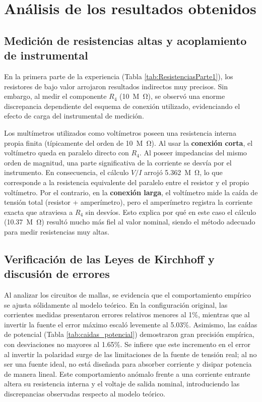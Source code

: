 \documentclass[11pt]{article}
\begin{document}
\section{Análisis de los resultados obtenidos}

\subsection{Medición de resistencias altas y acoplamiento de instrumental}
En la primera parte de la experiencia (Tabla \ref{tab:ResistenciasParte1}), los resistores de bajo valor arrojaron resultados indirectos muy precisos. Sin embargo, al medir el componente $R_4$ (\SI{10}{M\ohm}), se observó una enorme discrepancia dependiente del esquema de conexión utilizado, evidenciando el efecto de carga del instrumental de medición. 

Los multímetros utilizados como voltímetros poseen una resistencia interna propia finita (típicamente del orden de \SI{10}{M\ohm}). Al usar la \textbf{conexión corta}, el voltímetro queda en paralelo directo con $R_4$. Al poseer impedancias del mismo orden de magnitud, una parte significativa de la corriente se desvía por el instrumento. En consecuencia, el cálculo $V/I$ arrojó \SI{5.362}{M\ohm}, lo que corresponde a la resistencia equivalente del paralelo entre el resistor y el propio voltímetro. Por el contrario, en la \textbf{conexión larga}, el voltímetro mide la caída de tensión total (resistor + amperímetro), pero el amperímetro registra la corriente exacta que atraviesa a $R_4$ sin desvíos. Esto explica por qué en este caso el cálculo (\SI{10.37}{M\ohm}) resultó mucho más fiel al valor nominal, siendo el método adecuado para medir resistencias muy altas.

\subsection{Verificación de las Leyes de Kirchhoff y discusión de errores}
Al analizar los circuitos de mallas, se evidencia que el comportamiento empírico se ajusta sólidamente al modelo teórico. En la configuración original, las corrientes medidas presentaron errores relativos menores al 1\%, mientras que al invertir la fuente el error máximo escaló levemente al 5.03\%. Asimismo, las caídas de potencial (Tabla \ref{tab:caidas_potencial}) demostraron gran precisión empírica, con desviaciones no mayores al 1.65\%. Se infiere que este incremento en el error al invertir la polaridad surge de las limitaciones de la fuente de tensión real; al no ser una fuente ideal, no está diseñada para absorber corriente y disipar potencia de manera lineal. Este comportamiento anómalo frente a una corriente entrante altera su resistencia interna y el voltaje de salida nominal, introduciendo las discrepancias observadas respecto al modelo teórico.
\end{document}
